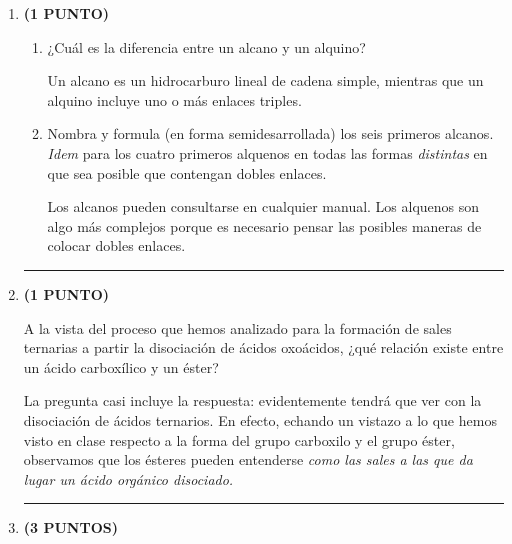 \documentclass[a4paper,14pt]{extarticle}
\newcommand{\halmos}{
\vspace*{-3ex}

\begin{flushright}
\rule{1mm}{2.5mm} \end{flushright}
}
\renewcommand{\qed}{\halmos}
\begin{document}
\begin{enumerate}
    \item \textbf{(1 PUNTO)}
    
    	\begin{enumerate}[label=\alph*)]
    		\item ¿Cuál es la diferencia entre un alcano y un alquino?
    		\begin{mdframed}[backgroundcolor=brown!10]  
    		Un alcano es un hidrocarburo lineal de cadena simple, mientras que un alquino incluye uno o más enlaces triples.
    		\end{mdframed}
    		\item  Nombra y formula (en forma semidesarrollada) los seis primeros alcanos. \textit{Idem} para los cuatro primeros alquenos en todas las formas \textit{distintas} en que sea posible que contengan dobles enlaces.
    		\begin{mdframed}[backgroundcolor=brown!10]  
    		Los alcanos pueden consultarse en cualquier manual. Los alquenos son algo más complejos porque es necesario pensar las posibles maneras de colocar dobles enlaces.
    		\end{mdframed}
    	\end{enumerate} 
    \qed
    
    
    \item \textbf{(1 PUNTO)}
    
     A la vista del proceso que hemos analizado para la formación de sales ternarias a partir la disociación de ácidos oxoácidos, ¿qué relación existe entre un ácido carboxílico y un éster? 
     \begin{mdframed}[backgroundcolor=brown!10]  
     La pregunta casi incluye la respuesta: evidentemente tendrá que ver con la disociación de ácidos ternarios. En efecto, echando un vistazo a lo que hemos visto en clase respecto a la forma del grupo carboxilo y el grupo éster, observamos que los ésteres pueden entenderse \textit{como las sales a las que da lugar un ácido orgánico disociado.}
     \end{mdframed}
    \qed
    
    \newpage
    
    \item \textbf{(3 PUNTOS)} 
    

\end{enumerate}
\end{document}
